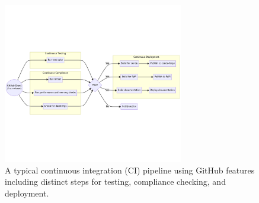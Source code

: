 \documentclass[]{nrel}
\begin{document}
\begin{figure}[htbp]
\begin{center}
\includegraphics[width=0.7\textwidth]{mermaid-diagram-2023-10-02-133543.png}
\caption{A typical continuous integration (CI) pipeline using GitHub features including distinct steps for testing, compliance checking, and deployment.}
\label{fig:ci_pipeline}
\end{center}
\end{figure}


\end{document}
